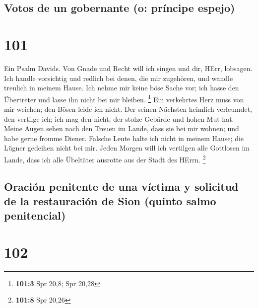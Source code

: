 \hypertarget{votos-de-un-gobernante-o-pruxedncipe-espejo}{%
\subsection{Votos de un gobernante (o: príncipe
espejo)}\label{votos-de-un-gobernante-o-pruxedncipe-espejo}}

\hypertarget{section-100}{%
\section{101}\label{section-100}}

 Ein Psalm Davids. Von Gnade und Recht will ich singen und
dir, HErr, lobsagen.  Ich handle vorsichtig und redlich
bei denen, die mir zugehören, und wandle treulich in meinem Hause.
 Ich nehme mir keine böse Sache vor; ich hasse den
Übertreter und lasse ihn nicht bei mir bleiben. \footnote{\textbf{101:3}
  Spr 20,8; Spr 20,28}  Ein verkehrtes Herz muss von mir
weichen; den Bösen leide ich nicht.  Der seinen Nächsten
heimlich verleumdet, den vertilge ich; ich mag den nicht, der stolze
Gebärde und hohen Mut hat.  Meine Augen sehen nach den
Treuen im Lande, dass sie bei mir wohnen; und habe gerne fromme Diener.
 Falsche Leute halte ich nicht in meinem Hause; die Lügner
gedeihen nicht bei mir.  Jeden Morgen will ich vertilgen
alle Gottlosen im Lande, dass ich alle Übeltäter ausrotte aus der Stadt
des HErrn. \footnote{\textbf{101:8} Spr 20,26}

\hypertarget{oraciuxf3n-penitente-de-una-vuxedctima-y-solicitud-de-la-restauraciuxf3n-de-sion-quinto-salmo-penitencial}{%
\subsection{Oración penitente de una víctima y solicitud de la
restauración de Sion (quinto salmo
penitencial)}\label{oraciuxf3n-penitente-de-una-vuxedctima-y-solicitud-de-la-restauraciuxf3n-de-sion-quinto-salmo-penitencial}}

\hypertarget{section-101}{%
\section{102}\label{section-101}}

